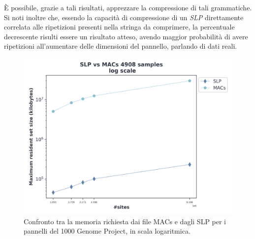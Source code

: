 È possibile, grazie a tali risultati, apprezzare la compressione di tali
grammatiche.  
Si noti inoltre che, essendo la capacità di compressione di un \textit{SLP}
direttamente correlata alle ripetizioni presenti nella stringa da comprimere, la
percentuale decrescente risulti essere un risultato atteso, avendo maggior
probabilità di avere ripetizioni all'aumentare delle dimensioni del pannello,
parlando di dati reali.
\begin{figure}
  \centering
  \includegraphics[width=0.7\linewidth]{img/slp_vs_macs_log.png}
  \caption{Confronto tra la memoria richiesta dai file MACs e dagli SLP per i
    pannelli del 1000 Genome Project, in scala
    logaritmica.} 
  \label{fig:slpmacschr}
\end{figure}
